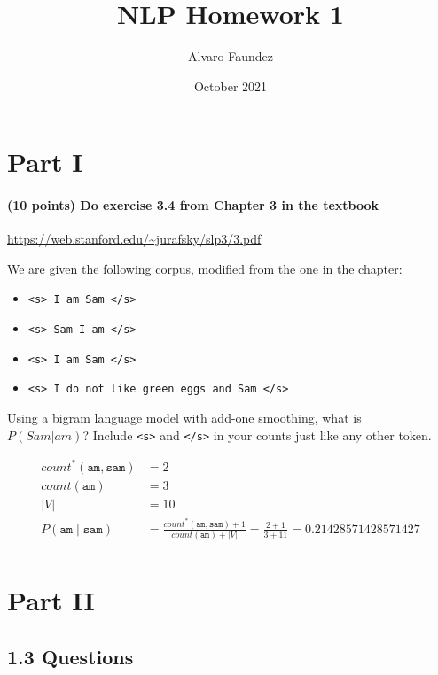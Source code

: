 \documentclass{article}
\title{NLP Homework 1}
\author{Alvaro Faundez}
\date{October 2021}
\begin{document}
\maketitle

\section*{Part I}

\paragraph{(10 points) Do exercise 3.4 from Chapter 3 in the textbook } \url{https://web.stanford.edu/~jurafsky/slp3/3.pdf}

We are given the following corpus, modified from the one in the chapter:

\begin{itemize}
    \item \texttt{<s> I am Sam </s>}
    \item \texttt{<s> Sam I am </s>}
    \item \texttt{<s> I am Sam </s>}
    \item \texttt{<s> I do not like green eggs and Sam </s>}
\end{itemize}

Using a bigram language model with add-one smoothing, what is \\ $P(Sam \vert am)$? Include \texttt{<s>} and \texttt{</s>} in your counts just like any other token.

\begin{equation}
\begin{split}
    count^{*}(\texttt{am} , \texttt{sam}) &= 2 \\
    count(\texttt{am}) &= 3 \\
    |V| &= 10 \\
    P(\texttt{am} \mid \texttt{sam}) &=  \frac{count^{*}(\texttt{am} , \texttt{sam}) + 1}{count(\texttt{am}) + |V|} = \frac{2 + 1}{3 + 11} = 0.21428571428571427  \\
\end{split}
\end{equation}

\section*{Part II}

\subsection*{1.3 Questions}
\end{document}
